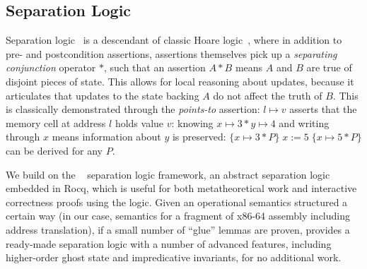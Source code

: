 \subsection{Separation Logic}
\label{sec:seplogic}
Separation logic~\cite{reynolds02} is a descendant of classic Hoare logic~\cite{hoare69},
where in addition to pre- and postcondition assertions, assertions themselves pick up a
\emph{separating conjunction} operator $\ast$, such that an assertion $A\ast B$ means $A$ and $B$ are true
of disjoint pieces of state. This allows for local reasoning about updates, because it articulates
that updates to the state backing $A$ do not affect the truth of $B$. This is classically demonstrated
through the \emph{points-to} assertion: $l\mapsto v$ asserts that the memory cell at address $l$ holds value $v$:
knowing $x\mapsto 3\ast y\mapsto 4$ and writing through $x$ means information about $y$ is preserved:
$\{x\mapsto 3\ast P\}\;x\mathrel{:=}5\;\{x\mapsto 5 \ast P\}$ can be derived for any $P$.

We build on the \iris~\cite{jung2018iris} separation logic framework,
an abstract separation logic embedded in Rocq, which is useful for both metatheoretical work
and interactive correctness proofs using the logic. Given an operational
semantics structured a certain way (in our case, semantics for
a fragment of x86-64 assembly including address translation),
if a small number of ``glue'' lemmas are proven, \iris
provides a ready-made separation logic with a number of advanced features, including
higher-order ghost state and impredicative invariants, for no additional work.

